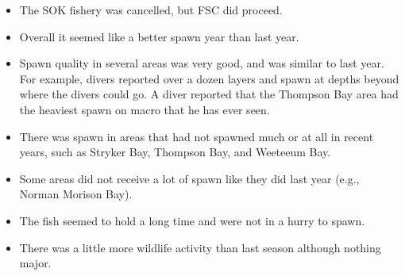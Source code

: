 \begin{itemize}

\item The SOK fishery was cancelled, but FSC did proceed.

\item Overall it seemed like a better spawn year than last year.

\item Spawn quality in several areas was very good, and was similar to last year.
For example, divers reported over a dozen layers and spawn at depths beyond where the divers could go.
A diver reported that the Thompson Bay area had the heaviest spawn on macro that he has ever seen.

\item There was spawn in areas that had not spawned much or at all in recent years, such as Stryker Bay, Thompson Bay, and Weeteeum Bay.

\item Some areas did not receive a lot of spawn like they did last year (e.g., Norman Morison Bay).

\item The fish seemed to hold a long time and were not in a hurry to spawn.

\item There was a little more wildlife activity than last season although nothing major.

\end{itemize}